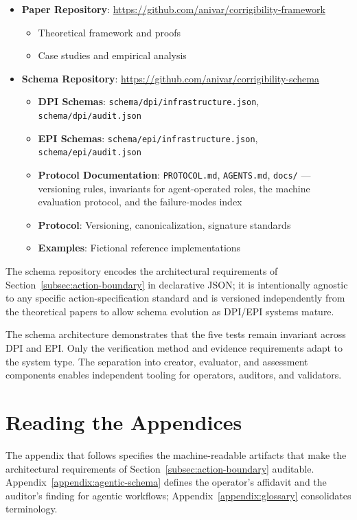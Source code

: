 \documentclass{article}
\theoremstyle{definition}
\begin{document}
\begin{itemize}
    \item \textbf{Paper Repository}: \url{https://github.com/anivar/corrigibility-framework}
    \begin{itemize}
        \item Theoretical framework and proofs
        \item Case studies and empirical analysis
    \end{itemize}
    \item \textbf{Schema Repository}: \url{https://github.com/anivar/corrigibility-schema}
    \begin{itemize}
        \item \textbf{DPI Schemas}: \texttt{schema/dpi/infrastructure.json}, \texttt{schema/dpi/audit.json}
        \item \textbf{EPI Schemas}: \texttt{schema/epi/infrastructure.json}, \texttt{schema/epi/audit.json}
        \item \textbf{Protocol Documentation}: \texttt{PROTOCOL.md}, \texttt{AGENTS.md}, \texttt{docs/} --- versioning rules, invariants for agent-operated roles, the machine evaluation protocol, and the failure-modes index
        \item \textbf{Protocol}: Versioning, canonicalization, signature standards
        \item \textbf{Examples}: Fictional reference implementations
    \end{itemize}
\end{itemize}

The schema repository encodes the architectural requirements of Section~\ref{subsec:action-boundary} in declarative JSON; it is intentionally agnostic to any specific action-specification standard and is versioned independently from the theoretical papers to allow schema evolution as DPI/EPI systems mature.

The schema architecture demonstrates that the five tests remain invariant across DPI and EPI. Only the verification method and evidence requirements adapt to the system type. The separation into creator, evaluator, and assessment components enables independent tooling for operators, auditors, and validators.

\section*{Reading the Appendices}

The appendix that follows specifies the machine-readable artifacts that make the architectural requirements of Section~\ref{subsec:action-boundary} auditable. Appendix~\ref{appendix:agentic-schema} defines the operator's affidavit and the auditor's finding for agentic workflows; Appendix~\ref{appendix:glossary} consolidates terminology.
\end{document}
